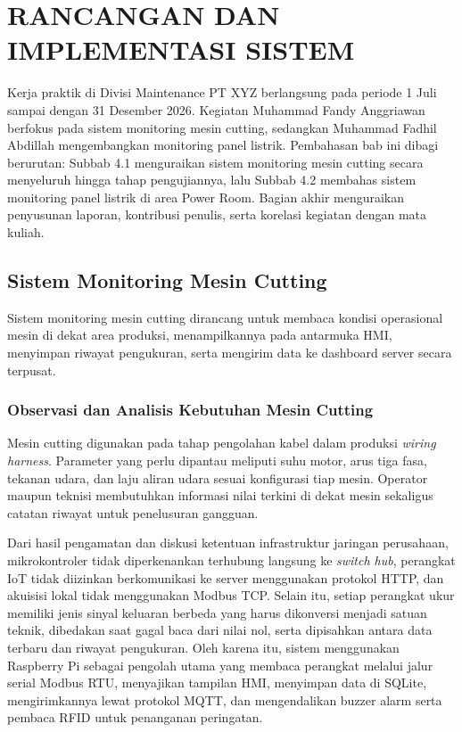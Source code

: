 \chapter{RANCANGAN DAN IMPLEMENTASI SISTEM}
Kerja praktik di Divisi Maintenance PT XYZ berlangsung pada periode 1 Juli sampai dengan 31 Desember 2026. Kegiatan Muhammad Fandy Anggriawan berfokus pada sistem monitoring mesin cutting, sedangkan Muhammad Fadhil Abdillah mengembangkan monitoring panel listrik. Pembahasan bab ini dibagi berurutan: Subbab 4.1 menguraikan sistem monitoring mesin cutting secara menyeluruh hingga tahap pengujiannya, lalu Subbab 4.2 membahas sistem monitoring panel listrik di area Power Room. Bagian akhir menguraikan penyusunan laporan, kontribusi penulis, serta korelasi kegiatan dengan mata kuliah.

\section{Sistem Monitoring Mesin Cutting}

Sistem monitoring mesin cutting dirancang untuk membaca kondisi operasional mesin di dekat area produksi, menampilkannya pada antarmuka HMI, menyimpan riwayat pengukuran, serta mengirim data ke dashboard server secara terpusat.

\subsection{Observasi dan Analisis Kebutuhan Mesin Cutting}

Mesin cutting digunakan pada tahap pengolahan kabel dalam produksi \textit{wiring harness}. Parameter yang perlu dipantau meliputi suhu motor, arus tiga fasa, tekanan udara, dan laju aliran udara sesuai konfigurasi tiap mesin. Operator maupun teknisi membutuhkan informasi nilai terkini di dekat mesin sekaligus catatan riwayat untuk penelusuran gangguan.

Dari hasil pengamatan dan diskusi ketentuan infrastruktur jaringan perusahaan, mikrokontroler tidak diperkenankan terhubung langsung ke \textit{switch hub}, perangkat IoT tidak diizinkan berkomunikasi ke server menggunakan protokol HTTP, dan akuisisi lokal tidak menggunakan Modbus TCP. Selain itu, setiap perangkat ukur memiliki jenis sinyal keluaran berbeda yang harus dikonversi menjadi satuan teknik, dibedakan saat gagal baca dari nilai nol, serta dipisahkan antara data terbaru dan riwayat pengukuran. Oleh karena itu, sistem menggunakan Raspberry Pi sebagai pengolah utama yang membaca perangkat melalui jalur serial Modbus RTU, menyajikan tampilan HMI, menyimpan data di SQLite, mengirimkannya lewat protokol MQTT, dan mengendalikan buzzer alarm serta pembaca RFID untuk penanganan peringatan.

